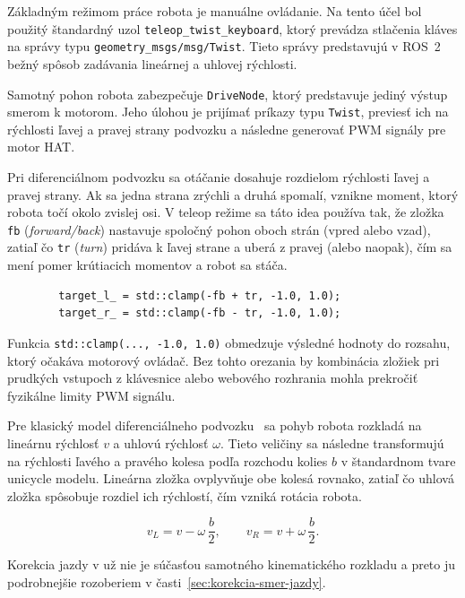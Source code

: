         Základným režimom práce robota je manuálne ovládanie. Na tento účel bol použitý štandardný uzol \texttt{teleop\_twist\_keyboard}, ktorý prevádza stlačenia kláves na správy typu \texttt{geometry\_msgs/msg/Twist}. Tieto správy predstavujú v ROS~2 bežný spôsob zadávania lineárnej a uhlovej rýchlosti.
      
        Samotný pohon robota zabezpečuje \texttt{DriveNode}, ktorý predstavuje jediný výstup smerom k motorom. Jeho úlohou je prijímať príkazy typu \texttt{Twist}, previesť ich na rýchlosti ľavej a pravej strany podvozku a následne generovať PWM signály pre motor HAT.
      
        Pri diferenciálnom podvozku sa otáčanie dosahuje rozdielom rýchlosti ľavej a pravej strany. Ak sa jedna strana zrýchli a druhá spomalí, vznikne moment, ktorý robota točí okolo zvislej osi. V teleop režime sa táto idea používa tak, že zložka \texttt{fb} (\emph{forward/back}) nastavuje spoločný pohon oboch strán (vpred alebo vzad), zatiaľ čo \texttt{tr} (\emph{turn}) pridáva k ľavej strane a uberá z pravej (alebo naopak), čím sa mení pomer krútiacich momentov a robot sa stáča.
      
        \begin{verbatim}
        target_l_ = std::clamp(-fb + tr, -1.0, 1.0);
        target_r_ = std::clamp(-fb - tr, -1.0, 1.0);
        \end{verbatim}
      
        Funkcia \texttt{std::clamp(..., -1.0, 1.0)} obmedzuje výsledné hodnoty do rozsahu, ktorý očakáva motorový ovládač. Bez tohto orezania by kombinácia zložiek pri prudkých vstupoch z klávesnice alebo webového rozhrania mohla prekročiť fyzikálne limity PWM signálu.
      
        Pre klasický model diferenciálneho podvozku~\cite{roboticsbook_diff_drive} sa pohyb robota rozkladá na lineárnu rýchlosť $v$ a uhlovú rýchlosť $\omega$. Tieto veličiny sa následne transformujú na rýchlosti ľavého a pravého kolesa podľa rozchodu kolies $b$ v štandardnom tvare unicycle modelu. Lineárna zložka ovplyvňuje obe kolesá rovnako, zatiaľ čo uhlová zložka spôsobuje rozdiel ich rýchlostí, čím vzniká rotácia robota.
      
        \begin{equation}
          v_L = v - \omega\,\frac{b}{2}, \qquad
          v_R = v + \omega\,\frac{b}{2}.
          \label{eq:diff-drive-unicycle}
        \end{equation}
      
        Korekcia jazdy v  už nie je súčasťou samotného kinematického rozkladu a preto ju podrobnejšie rozoberiem v časti~\ref{sec:korekcia-smer-jazdy}.
      
